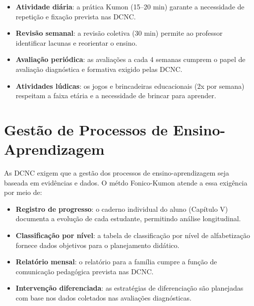\begin{itemize}[leftmargin=2cm]
  \item \textbf{Atividade di\'{a}ria}: a pr\'{a}tica Kumon (15--20 min)
  garante a necessidade de repeti\c{c}\~{a}o e fixa\c{c}\~{a}o
  prevista nas DCNC.

  \item \textbf{Revis\~{a}o semanal}: a revis\~{a}o coletiva (30 min)
  permite ao professor identificar lacunas e reorientar o ensino.

  \item \textbf{Avalia\c{c}\~{a}o peri\'{o}dica}: as avalia\c{c}\~{o}es
  a cada 4 semanas cumprem o papel de avalia\c{c}\~{a}o diagn\'{o}stica
  e formativa exigido pelas DCNC.

  \item \textbf{Atividades l\'{u}dicas}: os jogos e brincadeiras
  educacionais (2x por semana) respeitam a faixa et\'{a}ria e a
  necessidade de brincar para aprender.
\end{itemize}

\section{Gest\~{a}o de Processos de Ensino-Aprendizagem}

As DCNC exigem que a gest\~{a}o dos processos de ensino-aprendizagem
seja baseada em evid\^{e}ncias e dados. O m\'{e}tdo Fonico-Kumon
atende a essa exigência por meio de:

\begin{itemize}[leftmargin=2cm]
  \item \textbf{Registro de progresso}: o caderno individual do aluno
  (Cap\'{i}tulo V) documenta a evolu\c{c}\~{a}o de cada estudante,
  permitindo an\'{a}lise longitudinal.

  \item \textbf{Classifica\c{c}\~{a}o por n\'{i}vel}: a tabela de
  classifica\c{c}\~{a}o por n\'{i}vel de alfabetiza\c{c}\~{a}o
  fornece dados objetivos para o planejamento did\'{a}tico.

  \item \textbf{Relat\'{o}rio mensal}: o relat\'{o}rio para a fam\'{i}lia
  cumpre a fun\c{c}\~{a}o de comunica\c{c}\~{a}o pedag\'{o}gica
  prevista nas DCNC.

  \item \textbf{Interven\c{c}\~{a}o diferenciada}: as estrat\'{e}gias
  de diferencia\c{c}\~{a}o s\~{a}o planejadas com base nos dados
  coletados nas avalia\c{c}\~{o}es diagn\'{o}sticas.
\end{itemize}

